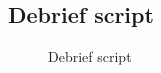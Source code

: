 \documentclass{l4proj}
\begin{document}
\begin{appendices}
\section{Debrief script}
\begin{figure}[H]
\centering
{}
\caption{Debrief script}
\label{appendix:debrief}
\end{figure}


\end{appendices}
\end{document}
